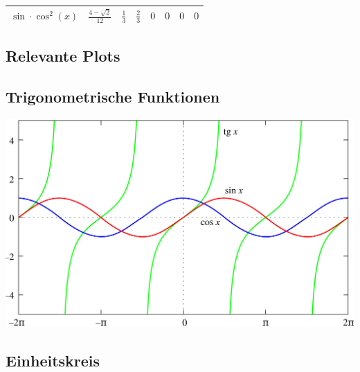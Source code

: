 \begin{multicols*}{2}
\begin{center}
\begin{tabular}{ r c c c c c c c }
            $\sin \cdot \cos^2(x)$ & $\frac{4-\sqrt{2}}{12}$                       & $\frac{1}{3}$                         & $\frac{2}{3}$               & $0$                          & $0$                                                  & $0$                                                  & $0$                              \\
            \bottomrule
        \end{tabular}
    \end{center}
\end{multicols*}

\begin{multicols*}{3}
    \section{Relevante Plots}

    \subsection{Trigonometrische Funktionen}

    \begin{center}
        \includegraphics[width=1\linewidth]{Bilder/Trigonometric_functions.png}
    \end{center}

    \subsection{Einheitskreis}


\end{multicols*}
